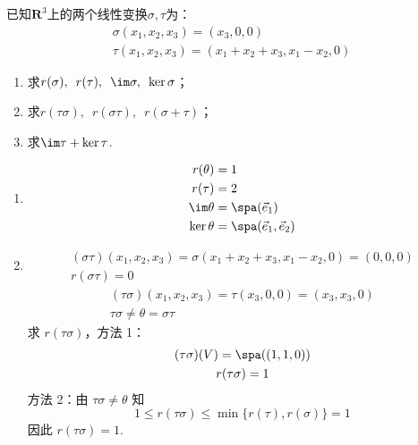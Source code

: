 \begin{exercise}
\begin{exgroup}
        \item 已知$\mathbf{R}^3$上的两个线性变换$\sigma,\tau$为：
        \begin{gather*}
            \sigma(x_1,x_2,x_3)=(x_3,0,0) \\
            \tau(x_1,x_2,x_3)=(x_1+x_2+x_3,x_1-x_2,0)
        \end{gather*}
        \begin{enumerate}
            \item 求$r(\sigma),\enspace r(\tau),\enspace \im\sigma,\enspace \ker\sigma$；

            \item 求$r(\tau\sigma),\enspace r(\sigma\tau),\enspace r(\sigma+\tau)$；

            \item 求$\im\tau+\ker\tau$.
        \end{enumerate}
        \begin{answer}
            \begin{enumerate}
                \item \begin{align*}
                          r(\theta)   & = 1                          \\
                          r(\tau)     & = 2                          \\
                          \im \theta  & = \spa(\vec{e}_1)            \\
                          \ker \theta & = \spa(\vec{e}_1, \vec{e}_2)
                      \end{align*}

                \item \begin{gather*}
                          (\sigma \tau)(x_1, x_2, x_3) = \sigma(x_1 + x_2 + x_3, x_1 - x_2, 0) = (0, 0, 0) \\
                          r(\sigma \tau) = 0
                      \end{gather*}
                      \begin{gather*}
                          (\tau \sigma)(x_1, x_2, x_3) = \tau(x_3, 0, 0) = (x_3, x_3, 0) \\
                          \tau \sigma \neq \theta = \sigma \tau
                      \end{gather*}
                      求 $ r(\tau \sigma) $，方法 1：
                      \begin{gather*}
                          (\tau \sigma)(V) = \spa((1, 1, 0)) \\
                          r(\tau \sigma) = 1
                      \end{gather*}
                      方法 2：由 $ \tau \sigma \neq \theta $ 知
                      \[ 1 \leqslant r(\tau \sigma) \leqslant \min\{r(\tau), r(\sigma)\} = 1 \]
                      因此 $ r(\tau \sigma) = 1 $.


\end{enumerate}
\end{answer}
\end{exgroup}
\end{exercise}
